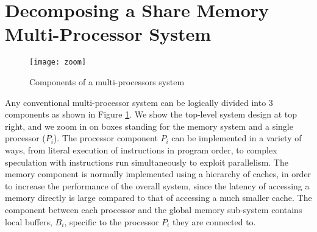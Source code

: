 %
%
%
%

\section{Decomposing a Share Memory Multi-Processor System}
\label{sec:store-atomicity}

\begin{figure}
\centering
\texttt{[image: zoom]}
\caption{Components of a multi-processors system}
\label{zoom}
\end{figure}

Any conventional multi-processor system can be logically divided into 3 components as shown in
Figure \ref{zoom}. 
We show the top-level system design at top right, and we zoom in on boxes standing for the
memory system and a single processor ($P_i$).
The processor component $P_i$ can be implemented in a
variety of ways, from literal execution of instructions in program order, to complex speculation
with instructions run simultaneously to exploit parallelism. The memory component is normally implemented
using a hierarchy of caches, in order to increase the performance of the
overall system, since the latency of accessing a memory directly is large
compared to that of accessing a much smaller cache. The component between each
processor and the global memory sub-system contains local buffers, $B_i$, specific to
the processor $P_i$ they are connected to. 

